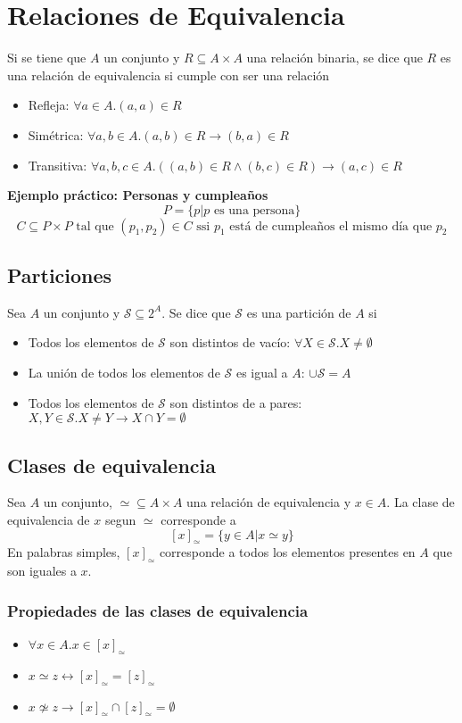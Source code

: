 \documentclass[../main.tex]{subfiles}
\begin{document}
\section{Relaciones de Equivalencia}
Si se tiene que $A$ un conjunto y $R \subseteq A \times A$ una relación binaria, se dice que $R$ es una relación de equivalencia si cumple con ser una relación
\begin{itemize}
    \item Refleja: $\forall a \in A . (a,a) \in R$
    \item Simétrica: $\forall a, b \in A . (a,b) \in R \rightarrow (b,a) \in R$
    \item Transitiva: $\forall a, b, c \in A . ((a,b) \in R \wedge (b,c) \in R) \rightarrow (a,c) \in R$
\end{itemize}

\textbf{Ejemplo práctico: Personas y cumpleaños}
\[ P = \{ p | p \text{ es una persona} \} \]
\[ C \subseteq P \times P \text{ tal que } (p_1, p_2) \in C \text{ ssi } p_1 \text{ está de cumpleaños el mismo día que } p_2 \]

\subsection{Particiones}
Sea $A$ un conjunto y $\mathcal{S} \subseteq 2^A$. Se dice que $\mathcal{S}$ es una partición de $A$ si
\begin{itemize}
    \item Todos los elementos de $\mathcal{S}$ son distintos de vacío: $\forall X \in \mathcal{S} . X \not= \emptyset$
    \item La unión de todos los elementos de $\mathcal{S}$ es igual a $A$: $\cup \mathcal{S} = A$
    \item Todos los elementos de $\mathcal{S}$ son distintos de a pares: $X, Y \in \mathcal{S} . X \not= Y \rightarrow X \cap Y = \emptyset$
\end{itemize}

\subsection{Clases de equivalencia}
Sea $A$ un conjunto, $\simeq \subseteq A \times A$ una relación de equivalencia y $x \in A$. La clase de equivalencia de $x$ segun $\simeq$ corresponde a
\[ [x]_\simeq = \{ y \in A | x \simeq y \} \]
En palabras simples, $[x]_\simeq$ corresponde a todos los elementos presentes en $A$ que son iguales a $x$.

\subsubsection{Propiedades de las clases de equivalencia}
\begin{itemize}
    \item $\forall x \in A . x \in [x]_\simeq$
    \item $x \simeq z \leftrightarrow [x]_\simeq = [z]_\simeq$
    \item $x \not\simeq z \rightarrow [x]_\simeq \cap [z]_\simeq = \emptyset$
\end{itemize}
\end{document}
